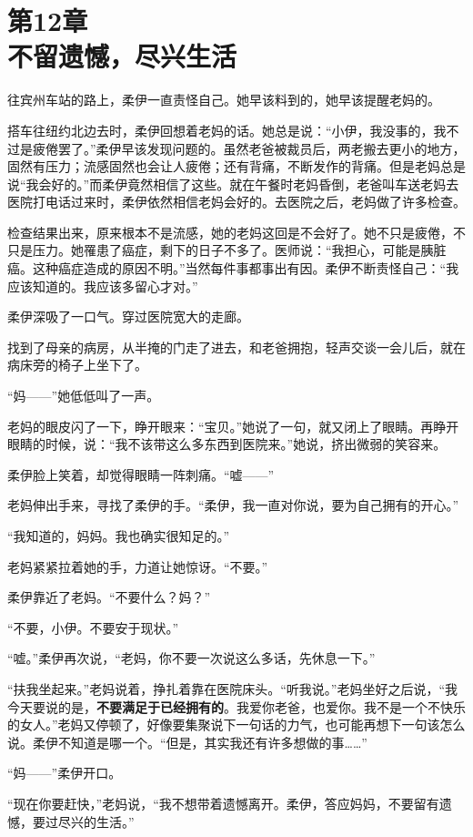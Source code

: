 \section[第12章\q 不留遗憾，尽兴生活]{第12章\\ 不留遗憾，尽兴生活}
\label{sec:ch12}

往宾州车站的路上，柔伊一直责怪自己。她早该料到的，她早该提醒老妈的。

搭车往纽约北边去时，柔伊回想着老妈的话。她总是说：“小伊，我没事的，我不过是疲倦罢了。”柔伊早该发现问题的。虽然老爸被裁员后，两老搬去更小的地方，固然有压力；流感固然也会让人疲倦；还有背痛，不断发作的背痛。但是老妈总是说“我会好的。”而柔伊竟然相信了这些。就在午餐时老妈昏倒，老爸叫车送老妈去医院打电话过来时，柔伊依然相信老妈会好的。去医院之后，老妈做了许多检查。

检查结果出来，原来根本不是流感，她的老妈这回是不会好了。她不只是疲倦，不只是压力。她罹患了癌症，剩下的日子不多了。医师说：“我担心，可能是胰脏癌。这种癌症造成的原因不明。”当然每件事都事出有因。柔伊不断责怪自己：“我应该知道的。我应该多留心才对。”

柔伊深吸了一口气。穿过医院宽大的走廊。

找到了母亲的病房，从半掩的门走了进去，和老爸拥抱，轻声交谈一会儿后，就在病床旁的椅子上坐下了。

“妈——”她低低叫了一声。

老妈的眼皮闪了一下，睁开眼来：“宝贝。”她说了一句，就又闭上了眼睛。再睁开眼睛的时候，说：“我不该带这么多东西到医院来。”她说，挤出微弱的笑容来。

柔伊脸上笑着，却觉得眼睛一阵刺痛。“嘘——”

老妈伸出手来，寻找了柔伊的手。“柔伊，我一直对你说，要为自己拥有的开心。”

“我知道的，妈妈。我也确实很知足的。”

老妈紧紧拉着她的手，力道让她惊讶。“不要。”

柔伊靠近了老妈。“不要什么？妈？”

“不要，小伊。不要安于现状。”

“嘘。”柔伊再次说，“老妈，你不要一次说这么多话，先休息一下。”

“扶我坐起来。”老妈说着，挣扎着靠在医院床头。“听我说。”老妈坐好之后说，“我今天要说的是，\textbf{不要满足于已经拥有的}。我爱你老爸，也爱你。我不是一个不快乐的女人。”老妈又停顿了，好像要集聚说下一句话的力气，也可能再想下一句该怎么说。柔伊不知道是哪一个。“但是，其实我还有许多想做的事……”

“妈——”柔伊开口。

“现在你要赶快，”老妈说，“我不想带着遗憾离开。柔伊，答应妈妈，不要留有遗憾，要过尽兴的生活。”

